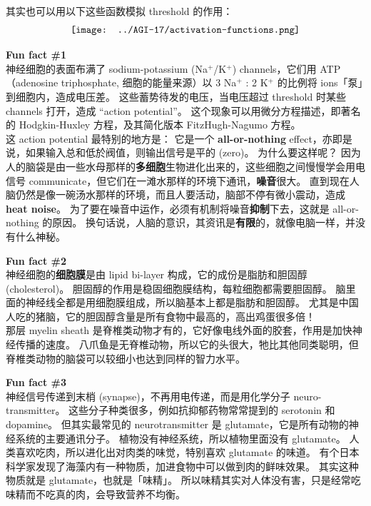 \documentclass[orivec]{llncs}
\begin{document}
其实也可以用以下这些函数模拟 threshold 的作用：
\begin{equation}
\vcenter{\hbox{\texttt{[image: ../AGI-17/activation-functions.png]}}}
\end{equation}

\begin{tcolorbox}[colback=lightyellow, breakable, enhanced]
\textbf{Fun fact \#1}\\

神经细胞的表面布满了 sodium-potassium (Na$^+$/K$^+$) channels，它们用 ATP （adenosine triphosphate, 细胞的能量来源）以 3 Na$^+$ : 2 K$^+$ 的比例将 ions「泵」到细胞内，造成电压差。 这些蓄势待发的电压，当电压超过 threshold 时某些 channels 打开，造成 ``action potential''。 这个现象可以用微分方程描述，即著名的 Hodgkin-Huxley 方程，及其简化版本 FitzHugh-Nagumo 方程。\\

这 action potential 最特别的地方是： 它是一个 \textbf{all-or-nothing} effect，亦即是说，如果输入总和低於阀值，则输出信号是平的 (zero)。 为什么要这样呢？  因为人的脑袋是由一些水母那样的\textbf{多细胞}生物进化出来的，这些细胞之间慢慢学会用电信号 communicate，但它们在一滩水那样的环境下通讯，\textbf{噪音}很大。 直到现在人脑仍然是像一碗汤水那样的环境，而且人要活动，脑部不停有微小震动，造成\textbf{heat noise}。 为了要在噪音中运作，必须有机制将噪音\textbf{抑制}下去，这就是 all-or-nothing 的原因。 换句话说，人脑的意识，其资讯是\textbf{有限}的，就像电脑一样，并没有什么神秘。
\end{tcolorbox}

\begin{tcolorbox}[colback=lightyellow, breakable, enhanced]
\textbf{Fun fact \#2} \\

神经细胞的\textbf{细胞膜}是由 lipid bi-layer 构成，它的成份是脂肪和胆固醇 (cholesterol)。 胆固醇的作用是稳固细胞膜结构，每粒细胞都需要胆固醇。 脑里面的神经线全都是用细胞膜组成，所以脑基本上都是脂肪和胆固醇。  尤其是中国人吃的猪脑，它的胆固醇含量是所有食物中最高的，高出鸡蛋很多倍！ \\

那层 myelin sheath 是脊椎类动物才有的，它好像电线外面的胶套，作用是加快神经传播的速度。 八爪鱼是无脊椎动物，所以它的头很大，牠比其他同类聪明，但脊椎类动物的脑袋可以较细小也达到同样的智力水平。
\end{tcolorbox}

\begin{tcolorbox}[colback=lightyellow, breakable, enhanced]
\textbf{Fun fact \#3} \\

神经信号传递到末梢 (synapse)，不再用电传递，而是用化学分子 neuro-transmitter。 这些分子种类很多，例如抗抑郁药物常常提到的 serotonin 和 dopamine。 但其实最常见的 neurotransmitter 是 glutamate，它是所有动物的神经系统的主要通讯分子。 植物没有神经系统，所以植物里面没有 glutamate。 人类喜欢吃肉，所以进化出对肉类的味觉，特别喜欢 glutamate 的味道。 有个日本科学家发现了海藻内有一种物质，加进食物中可以做到肉的鲜味效果。  其实这种物质就是 glutamate，也就是「味精」。 所以味精其实对人体没有害，只是经常吃味精而不吃真的肉，会导致营养不均衡。 
\end{tcolorbox}
\end{document}
